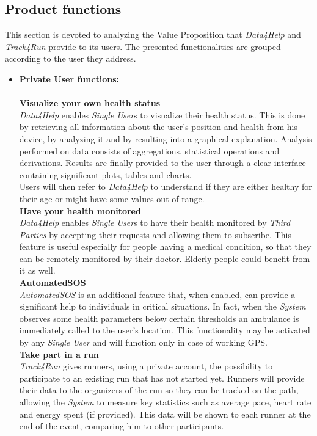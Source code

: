 \documentclass[titlepage]{article}
\begin{document}
	\subsection{Product functions}
	This section is devoted to analyzing the Value Proposition that {\it Data4Help} and {\it Track4Run} provide to its users. The presented functionalities are grouped according to the user they address.\\
	
	\begin{itemize}
	\item{\bf Private User functions:}\\
	\\
	{\bf Visualize your own health status} \\
{\it Data4Help} enables {\it Single User}s to visualize their health status. This is done by retrieving all information about the user’s position and health from his device, by analyzing it and by resulting into a graphical explanation. Analysis performed on data consists of aggregations, statistical operations and derivations. Results are finally provided to the user through a clear interface containing significant plots, tables and charts.\\
Users will then refer to {\it Data4Help} to understand if they are either healthy for their age or might have some values out of range. \\

{\bf Have your health monitored} \\
{\it Data4Help} enables {\it Single User}s to have their health monitored by {\it Third Parties} by accepting their requests and allowing them to subscribe. This feature is useful especially for people having a medical condition, so that they can be remotely monitored by their doctor. Elderly people could benefit from it as well.\\

{\bf AutomatedSOS}\\
{\it AutomatedSOS} is an additional feature that, when enabled, can provide a significant help to individuals in critical situations. In fact, when the {\it System} observes some health parameters below certain thresholds an ambulance is immediately called to the user’s location. This functionality may be activated by any {\it Single User} and will function only in case of working GPS.\\

{\bf Take part in a run} \\
{\it Track4Run} gives runners, using a private account, the possibility to participate to an existing run that has not started yet. Runners will provide their data to the organizers of the run so they can be tracked on the path, allowing the {\it System} to measure key statistics such as average pace, heart rate and energy spent (if provided). This data will be shown to each runner at the end of the event, comparing him to other participants.\\


\end{itemize}
\end{document}
